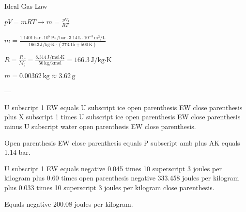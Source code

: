 Ideal Gas Law  

\( pV = mRT \rightarrow m = \frac{pV_1}{RT_1} \)  

\( m = \frac{1.1401 \, \text{bar} \cdot 10^5 \, \text{Pa/bar} \cdot 3.14 \, \text{L} \cdot 10^{-3} \, \text{m}^3/\text{L}}{166.3 \, \text{J/kg·K} \cdot (273.15 + 500 \, \text{K})} \)  

\( R = \frac{R_T}{M_g} = \frac{8.314 \, \text{J/mol·K}}{50 \, \text{kg/kmol}} = 166.3 \, \text{J/kg·K} \)  

\( m = 0.00362 \, \text{kg} \approx 3.62 \, \text{g} \)  

---

U subscript 1 EW equals U subscript ice open parenthesis EW close parenthesis plus X subscript 1 times U subscript ice open parenthesis EW close parenthesis minus U subscript water open parenthesis EW close parenthesis.  

Open parenthesis EW close parenthesis equals P subscript amb plus AK equals 1.14 bar.  

U subscript 1 EW equals negative 0.045 times 10 superscript 3 joules per kilogram plus 0.60 times open parenthesis negative 333.458 joules per kilogram plus 0.033 times 10 superscript 3 joules per kilogram close parenthesis.  

Equals negative 200.08 joules per kilogram.